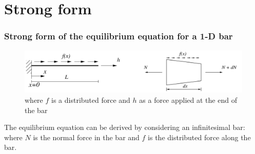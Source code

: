 \documentclass[notes]{beamer}
\begin{document}
\section{Strong form}

\begin{frame}
\frametitle{Strong form of the equilibrium equation for a 1-D bar}
\begin{figure}
	\includegraphics[width=\textwidth]{figs/strong-form-1d-bar.png}
	\caption*{where $f$ is a distributed force and $h$ as a force applied at the end of the bar}
\end{figure}
The equilibrium equation can be derived by considering an infinitesimal bar: 
where $N$ is the normal force in the bar and $f$ is the distributed force along the bar.
\end{frame}
\end{document}
